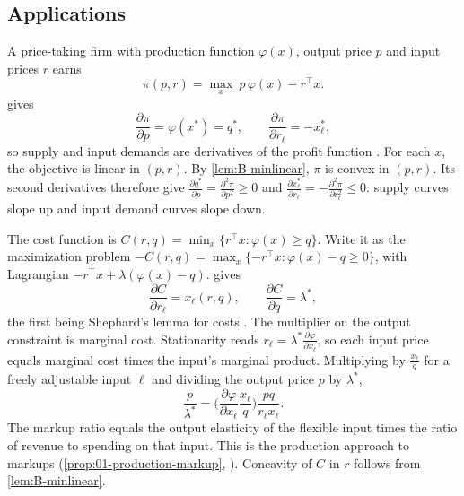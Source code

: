 \subsection{Applications}\label{sec:B-envelope-apps}

\begin{example}\label{ex:B-hotelling}
A price-taking firm with production function $\varphi(x)$, output price $p$ and input prices $r$ earns
\begin{equation*}
\pi(p, r) = \max_x\ p\,\varphi(x) - r^\top x .
\end{equation*}
 gives
\begin{equation*}
\frac{\partial \pi}{\partial p} = \varphi(x^*) = q^* , \qquad \frac{\partial \pi}{\partial r_\ell} = -x_\ell^* ,
\end{equation*}
so supply and input demands are derivatives of the profit function \citep{Hotelling1932}. For each $x$, the objective is
linear in $(p, r)$. By \cref{lem:B-minlinear}, $\pi$ is convex in $(p, r)$. Its second derivatives therefore give
$\frac{\partial q^*}{\partial p} = \frac{\partial^2 \pi}{\partial p^2} \geq 0$ and $\frac{\partial x_\ell^*}{\partial r_\ell} = -\frac{\partial^2 \pi}{\partial r_\ell^2} \leq 0$:
supply curves slope up and input demand curves slope down.
\end{example}

\begin{example}\label{ex:B-shephard-cost}
The cost function is $C(r, q) = \min_x\{r^\top x : \varphi(x) \geq q\}$. Write it as the maximization problem
$-C(r, q) = \max_x\{-r^\top x : \varphi(x) - q \geq 0\}$, with Lagrangian $-r^\top x + \lambda(\varphi(x) - q)$.
 gives
\begin{equation*}
\frac{\partial C}{\partial r_\ell} = x_\ell(r, q) , \qquad \frac{\partial C}{\partial q} = \lambda^* ,
\end{equation*}
the first being Shephard's lemma for costs \citep{Shephard1953}. The multiplier on the output constraint is marginal
cost. Stationarity reads $r_\ell = \lambda^*\frac{\partial \varphi}{\partial x_\ell}$, so each input price equals marginal cost times
the input's marginal product. Multiplying by $\frac{x_\ell}{q}$ for a freely adjustable input $\ell$ and dividing the output
price $p$ by $\lambda^*$,
\begin{equation*}
\frac{p}{\lambda^*} = \Big(\frac{\partial \varphi}{\partial x_\ell}\frac{x_\ell}{q}\Big)\frac{pq}{r_\ell x_\ell} .
\end{equation*}
The markup ratio equals the output elasticity of the flexible input times the ratio of revenue to spending on that
input. This is the production approach to markups (\cref{prop:01-production-markup}, \citealp{DeLoeckerWarzynski2012}).
Concavity of $C$ in $r$ follows from \cref{lem:B-minlinear}.
\end{example}

